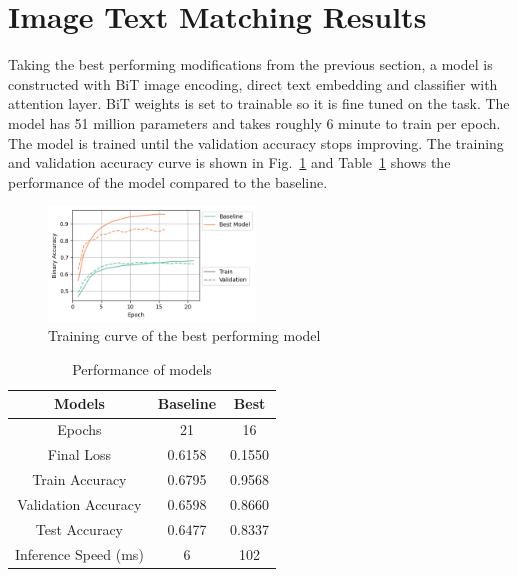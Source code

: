 \documentclass[conference]{IEEEtran}
\begin{document}
\section{Image Text Matching Results}

Taking the best performing modifications from the previous section, a model is constructed with BiT image encoding, direct text embedding and classifier with attention layer. BiT weights is set to trainable so it is fine tuned on the task. The model has 51 million parameters and takes roughly 6 minute to train per epoch. The model is trained until the validation accuracy stops improving. The training and validation accuracy curve is shown in Fig.~\ref{fig:final_model_accuracy} and Table~\ref{tab:final_model_accuracy} shows the performance of the model compared to the baseline.

\begin{figure}
    \centering
    \includegraphics[width=0.49\textwidth]{final_model_accuracy.png}
    \caption{Training curve of the best performing model}
    \label{fig:final_model_accuracy}
\end{figure}

\begin{table}
    \centering
    \caption{Performance of models}
    \begin{tabular}{| c | c | c |}
        \toprule
        Models               & Baseline & Best   \\
        \midrule
        Epochs               & 21       & 16     \\
        \midrule
        Final Loss           & 0.6158   & 0.1550 \\
        \midrule
        Train Accuracy       & 0.6795   & 0.9568 \\
        \midrule
        Validation Accuracy  & 0.6598   & 0.8660 \\
        \midrule
        Test Accuracy        & 0.6477   & 0.8337 \\
        \midrule
        Inference Speed (ms) & 6        & 102    \\
        \bottomrule
    \end{tabular}
    \label{tab:final_model_accuracy}
\end{table}
\end{document}
